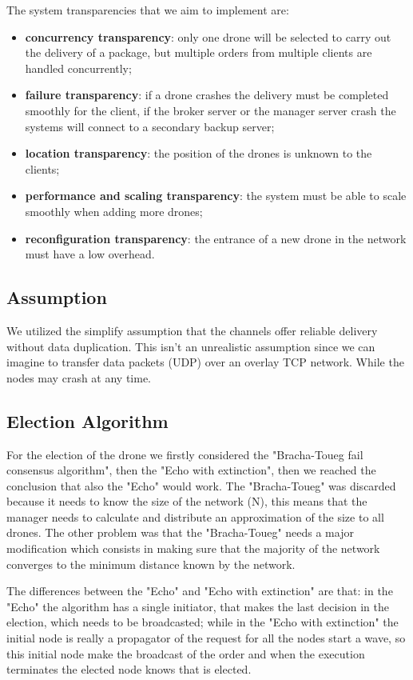 \documentclass[a4paper, oneside]{memoir}
\begin{document}
The system transparencies that we aim to implement are:
\begin{itemize}
	\item \textbf{concurrency transparency}: only one drone will be selected to carry out the delivery of a package, but multiple orders from multiple clients are handled concurrently;
	\item \textbf{failure transparency}: if a drone crashes the delivery must be completed smoothly for the client, if the broker server or the manager server crash the systems will connect to a secondary backup server;
	\item \textbf{location transparency}: the position of the drones is unknown to the clients;
	\item \textbf{performance and scaling transparency}: the system must be able to scale smoothly when adding more drones;
	\item \textbf{reconfiguration transparency}: the entrance of a new drone in the network must have a low overhead.
\end{itemize}

\subsection{Assumption}
We utilized the simplify assumption that the channels offer reliable delivery without data duplication. This isn't an unrealistic assumption since we can imagine to transfer data packets (UDP) over an overlay TCP network. While the nodes may crash at any time.

\subsection{Election Algorithm}
For the election of the drone we firstly considered the "Bracha-Toueg fail consensus algorithm", then the "Echo with extinction", then we reached the conclusion that also the "Echo" would work.
The "Bracha-Toueg" was discarded because it needs to know the size of the network (N), this means that the manager needs to calculate and distribute an approximation of the size to all drones.
The other problem was that the "Bracha-Toueg" needs a major modification which consists in making sure that the majority of the network converges to the minimum distance known by the network.

The differences between the "Echo" and "Echo with extinction" are that: in the "Echo" the algorithm has a single initiator, that makes the last decision in the election, which needs to be broadcasted; while in the "Echo with extinction" the initial node is really a propagator of the request for all the nodes start a wave, so this initial node make the broadcast of the order and when the execution terminates the elected node knows that is elected.
\end{document}
